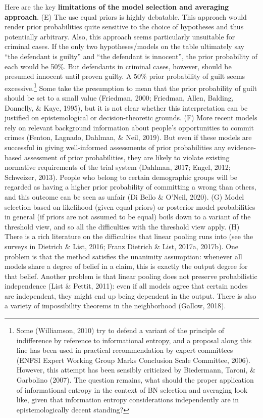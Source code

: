 \documentclass[11pt,dvipsnames,enabledeprecatedfontcommands]{scrartcl}
\begin{document}
Here are the key
\textbf{limitations of the model selection and averaging approach}. (E)
The use equal priors is highly debatable. This approach would render
prior probabilities quite sensitive to the choice of hypotheses and thus
potentially arbitrary. Also, this approach seems particularly unsuitable
for criminal cases. If the only two hypotheses/models on the table
ultimately say ``the defendant is guilty'' and ``the defendant is
innocent'', the prior probability of each would be 50\%. But defendants
in criminal cases, however, should be presumed innocent until proven
guilty. A 50\% prior probability of guilt seems excessive.\footnote{Some
  (Williamson, 2010) try to defend a variant of the principle of
  indifference by reference to informational entropy, and a proposal
  along this line has been used in practical recommendation by expert
  committees (ENFSI Expert Working Group Marks Conclusion Scale
  Committee, 2006). However, this attempt has been sensibly criticized
  by Biedermann, Taroni, \& Garbolino (2007). The question remains, what
  should the proper application of informational entropy in the context
  of BN selection and averaging look like, given that information
  entropy considerations independently are in epistemologically decent
  standing?} Some take the presumption to mean that the prior
probability of guilt should be set to a small value (Friedman, 2000;
Friedman, Allen, Balding, Donnelly, \& Kaye, 1995), but it is not clear
whether this interpretation can be justified on epistemological or
decision-theoretic grounds. (F) More recent models rely on relevant
background information about people's opportunities to commit crimes
(Fenton, Lagnado, Dahlman, \& Neil, 2019). But even if these models are
successful in giving well-informed assessments of prior probabilities
any evidence-based assessment of prior probabilities, they are likely to
violate existing normative requirements of the trial system (Dahlman,
2017; Engel, 2012; Schweizer, 2013). People who belong to certain
demographic groups will be regarded as having a higher prior probability
of committing a wrong than others, and this outcome can be seen as
unfair (Di Bello \& O'Neil, 2020). (G) Model selection based on
likelihood (given equal priors) or posterior model probabilities in
general (if priors are not assumed to be equal) boils down to a variant
of the threshold view, and so all the difficulties with the threshold
view apply. (H) There is a rich literature on the difficulties that
linear pooling runs into (see the surveys in Dietrich \& List, 2016;
Franz Dietrich \& List, 2017a, 2017b). One problem is that the method
satisfies the unanimity assumption: whenever all models share a degree
of belief in a claim, this is exactly the output degree for that belief.
Another problem is that linear pooling does not preserve probabilistic
independence (List \& Pettit, 2011): even if all models agree that
certain nodes are independent, they might end up being dependent in the
output. There is also a variety of impossibility theorems in the
neighborhood (Gallow, 2018).
\end{document}
